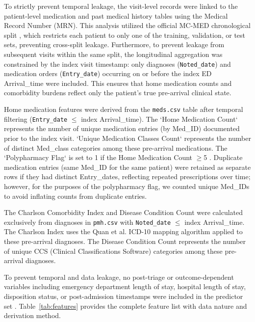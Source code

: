 \documentclass[harvard,article]{frontiersinFPHY_FAMS}
\begin{document}
To strictly prevent temporal leakage, the visit-level records were linked to the patient-level medication and past medical history tables using the Medical Record Number (MRN). This analysis utilized the official MC-MED chronological split \cite{kansal2025}, which restricts each patient to only one of the training, validation, or test sets, preventing cross-split leakage. Furthermore, to prevent leakage from subsequent visits within the same split, the longitudinal aggregation was constrained by the index visit timestamp: only diagnoses (\texttt{Noted\_date}) and medication orders (\texttt{Entry\_date}) occurring on or before the index ED Arrival\_time were included. This ensures that home medication counts and comorbidity burdens reflect only the patient's true pre-arrival clinical state.

Home medication features were derived from the \texttt{meds.csv} table after temporal filtering (\texttt{Entry\_date} $\leq$ index Arrival\_time). The `Home Medication Count` represents the number of unique medication entries (by Med\_ID) documented prior to the index visit. `Unique Medication Classes Count` represents the number of distinct Med\_class categories among these pre-arrival medications. The `Polypharmacy Flag` is set to 1 if the Home Medication Count $\geq$5 \cite{who2025}. Duplicate medication entries (same Med\_ID for the same patient) were retained as separate rows if they had distinct Entry\_dates, reflecting repeated prescriptions over time; however, for the purposes of the polypharmacy flag, we counted unique Med\_IDs to avoid inflating counts from duplicate entries.

The Charlson Comorbidity Index and Disease Condition Count were calculated exclusively from diagnoses in \texttt{pmh.csv} with \texttt{Noted\_date} $\leq$ index Arrival\_time. The Charlson Index uses the Quan et al. \cite{charlson1987,quan2005} ICD-10 mapping algorithm applied to these pre-arrival diagnoses. The Disease Condition Count represents the number of unique CCS (Clinical Classifications Software) categories among these pre-arrival diagnoses.

To prevent temporal and data leakage, no post-triage or outcome-dependent variables including emergency department length of stay, hospital length of stay, disposition status, or post-admission timestamps were included in the predictor set \cite{barbiero2022}. Table~\ref{tab:features} provides the complete feature list with data nature and derivation method.
\end{document}

